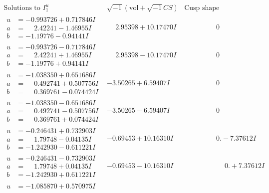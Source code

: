 \documentclass[1p]{elsarticle_modified}
\theoremstyle{definition}
\newcommand{\I}{\sqrt{-1}}
\begin{document}
$$\begin{array}{c|c|c}
\text{Solutions to }I^u_{1}& \I (\text{vol} + \sqrt{-1}CS) & \text{Cusp shape}\\
 \hline 
\begin{aligned}
u &= -0.993726 + 0.717846 I \\
a &= \phantom{-}2.42241 - 1.46955 I \\
b &= -1.19776 - 0.94141 I\end{aligned}
 & \phantom{-}2.95398 + 10.17470 I & \phantom{-0.000000 } 0 \\ \hline\begin{aligned}
u &= -0.993726 - 0.717846 I \\
a &= \phantom{-}2.42241 + 1.46955 I \\
b &= -1.19776 + 0.94141 I\end{aligned}
 & \phantom{-}2.95398 - 10.17470 I & \phantom{-0.000000 } 0 \\ \hline\begin{aligned}
u &= -1.038350 + 0.651686 I \\
a &= \phantom{-}0.492741 + 0.507756 I \\
b &= \phantom{-}0.369761 - 0.074424 I\end{aligned}
 & -3.50265 + 6.59407 I & \phantom{-0.000000 } 0 \\ \hline\begin{aligned}
u &= -1.038350 - 0.651686 I \\
a &= \phantom{-}0.492741 - 0.507756 I \\
b &= \phantom{-}0.369761 + 0.074424 I\end{aligned}
 & -3.50265 - 6.59407 I & \phantom{-0.000000 } 0 \\ \hline\begin{aligned}
u &= -0.246431 + 0.732903 I \\
a &= \phantom{-}1.79748 - 0.04135 I \\
b &= -1.242930 - 0.611221 I\end{aligned}
 & -0.69453 + 10.16310 I & \phantom{-0.000000 } 0. - 7.37612 I \\ \hline\begin{aligned}
u &= -0.246431 - 0.732903 I \\
a &= \phantom{-}1.79748 + 0.04135 I \\
b &= -1.242930 + 0.611221 I\end{aligned}
 & -0.69453 - 10.16310 I & \phantom{-0.000000 -}0. + 7.37612 I \\ \hline\begin{aligned}
u &= -1.085870 + 0.570975 I \\

\end{aligned}
\end{array}$$
\end{document}
